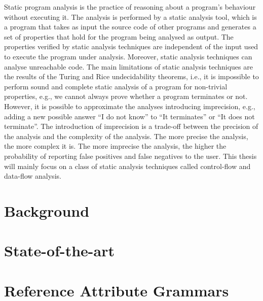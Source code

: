 Static program analysis is the practice of reasoning about a program's behaviour without executing it.
The analysis is performed by a static analysis tool,
which is a program that takes as input the source code of other programs and
generates a set of properties that hold for the program being analysed as output.
The properties verified by static analysis techniques are independent of the input
used to execute the program under analysis. Moreover, static analysis techniques can analyse unreachable code.
The main limitations of static analysis techniques are the results of the Turing and Rice undecidability
theorems, i.e., it is impossible to perform sound and complete static analysis of a program for non-trivial properties, e.g., 
we cannot always prove whether a program terminates or not. However, it is possible
to approximate the analyses introducing imprecision, e.g., adding a new possible answer
``I do not know'' to  ``It terminates'' or ``It does not terminate''. The introduction 
of imprecision is a trade-off between the precision of the analysis and the complexity
of the analysis. The more precise the analysis, the more complex it is. 
The more imprecise the analysis, the higher the probability of reporting 
false positives and false negatives to the user. This thesis will mainly focus on
a class of static analysis techniques called control-flow and data-flow analysis. 


\section{Background}


\section{State-of-the-art}


\section{Reference Attribute Grammars}




